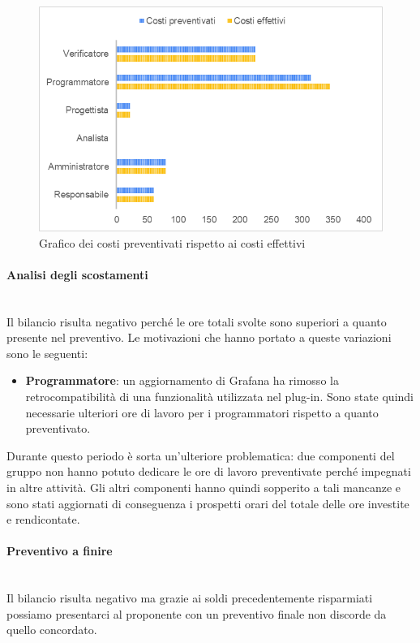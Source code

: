 \begin{figure} [H]
	\includegraphics[width=\linewidth]{./img/Grafici/ra-consuntivo6.png}
	\caption{Grafico dei costi preventivati rispetto ai costi effettivi}
\end{figure}

\paragraph*{Analisi degli scostamenti} \mbox{} \\
Il bilancio risulta negativo perché le ore totali svolte sono superiori a quanto presente nel preventivo.
Le motivazioni che hanno portato a queste variazioni sono le seguenti:
\begin{itemize}
	\item \textbf{Programmatore}: un aggiornamento di Grafana ha rimosso la retrocompatibilità di una funzionalità utilizzata nel plug-in. Sono state quindi necessarie ulteriori ore di lavoro per i programmatori rispetto a quanto preventivato.
\end{itemize}
Durante questo periodo è sorta un'ulteriore problematica: due componenti del gruppo non hanno potuto dedicare le ore di lavoro preventivate perché impegnati in altre attività. Gli altri componenti hanno quindi sopperito a tali mancanze e sono stati aggiornati di conseguenza i prospetti orari del totale delle ore investite e rendicontate. 

\paragraph*{Preventivo a finire} \mbox{} \\
Il bilancio risulta negativo ma grazie ai soldi precedentemente risparmiati possiamo presentarci al proponente con un preventivo finale non discorde da quello concordato. 


